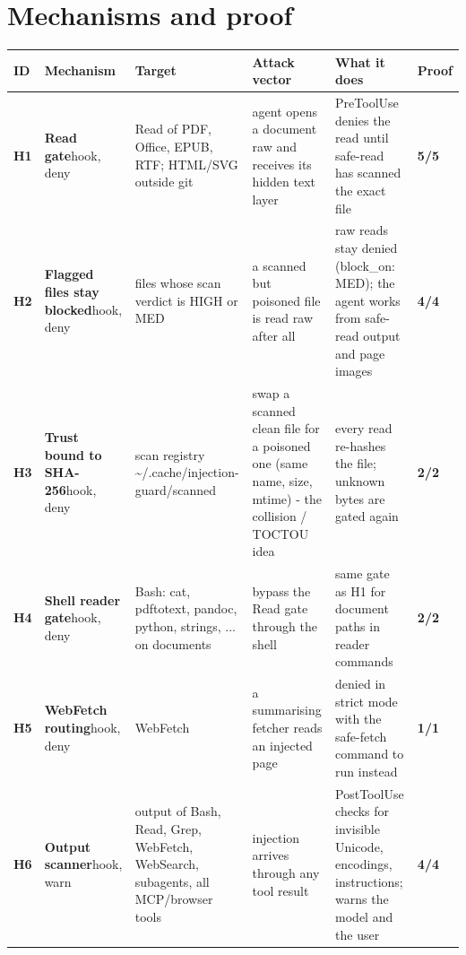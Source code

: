 \documentclass[10pt,a4paper]{article}
\begin{document}
\section{Mechanisms and proof}
\begin{longtable}{@{}P{0.6cm}P{2.6cm}P{3.1cm}P{4.4cm}P{4.4cm}P{1.4cm}@{}}\toprule
ID & Mechanism & Target & Attack vector & What it does & Proof\\\midrule\endhead
\textbf{H1} & \textbf{Read gate}\newline\footnotesize hook, deny & \footnotesize Read of PDF, Office, EPUB, RTF; HTML/SVG outside git & \footnotesize agent opens a document raw and receives its hidden text layer & \footnotesize PreToolUse denies the read until safe-read has scanned the exact file & \textcolor{ok}{\textbf{5/5}}\\
\textbf{H2} & \textbf{Flagged files stay blocked}\newline\footnotesize hook, deny & \footnotesize files whose scan verdict is HIGH or MED & \footnotesize a scanned but poisoned file is read raw after all & \footnotesize raw reads stay denied (block\_on: MED); the agent works from safe-read output and page images & \textcolor{ok}{\textbf{4/4}}\\
\textbf{H3} & \textbf{Trust bound to SHA-256}\newline\footnotesize hook, deny & \footnotesize scan registry \textasciitilde{}/.cache/injection-guard/scanned & \footnotesize swap a scanned clean file for a poisoned one (same name, size, mtime) - the collision / TOCTOU idea & \footnotesize every read re-hashes the file; unknown bytes are gated again & \textcolor{ok}{\textbf{2/2}}\\
\textbf{H4} & \textbf{Shell reader gate}\newline\footnotesize hook, deny & \footnotesize Bash: cat, pdftotext, pandoc, python, strings, ... on documents & \footnotesize bypass the Read gate through the shell & \footnotesize same gate as H1 for document paths in reader commands & \textcolor{ok}{\textbf{2/2}}\\
\textbf{H5} & \textbf{WebFetch routing}\newline\footnotesize hook, deny & \footnotesize WebFetch & \footnotesize a summarising fetcher reads an injected page & \footnotesize denied in strict mode with the safe-fetch command to run instead & \textcolor{ok}{\textbf{1/1}}\\
\textbf{H6} & \textbf{Output scanner}\newline\footnotesize hook, warn & \footnotesize output of Bash, Read, Grep, WebFetch, WebSearch, subagents, all MCP/browser tools & \footnotesize injection arrives through any tool result & \footnotesize PostToolUse checks for invisible Unicode, encodings, instructions; warns the model and the user & \textcolor{ok}{\textbf{4/4}}\\

\end{longtable}
\end{document}

